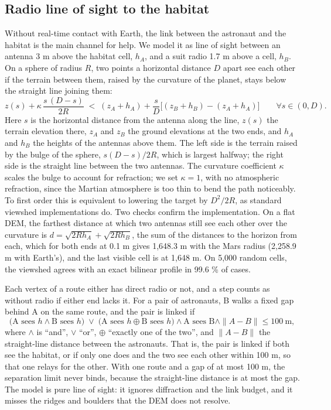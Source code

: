 \documentclass[11pt,a4paper]{article}
\begin{document}
\subsection{Radio line of sight to the habitat}

Without real-time contact with Earth, the link between the astronaut and the habitat is the main channel for help. We model it as line of sight between an antenna 3 m above the habitat cell, $h_A$, and a suit radio 1.7 m above a cell, $h_B$. On a sphere of radius $R$, two points a horizontal distance $D$ apart see each other if the terrain between them, raised by the curvature of the planet, stays below the straight line joining them: \[z(s) + \kappa\,\frac{s\,(D - s)}{2R} \;<\; (z_A + h_A) + \frac{s}{D}\big[(z_B + h_B) - (z_A + h_A)\big]\qquad \forall s \in (0, D).\] Here $s$ is the horizontal distance from the antenna along the line, $z(s)$ the terrain elevation there, $z_A$ and $z_B$ the ground elevations at the two ends, and $h_A$ and $h_B$ the heights of the antennas above them. The left side is the terrain raised by the bulge of the sphere, $s(D - s)/2R$, which is largest halfway; the right side is the straight line between the two antennas. The curvature coefficient $\kappa$ scales the bulge to account for refraction; we set $\kappa = 1$, with no atmospheric refraction, since the Martian atmosphere is too thin to bend the path noticeably. To first order this is equivalent to lowering the target by $D^2/2R$, as standard viewshed implementations do. Two checks confirm the implementation. On a flat DEM, the farthest distance at which two antennas still see each other over the curvature is $d = \sqrt{2Rh_A} + \sqrt{2Rh_B}$, the sum of the distances to the horizon from each, which for both ends at 0.1 m gives 1,648.3 m with the Mars radius (2,258.9 m with Earth's), and the last visible cell is at 1,648 m. On 5,000 random cells, the viewshed agrees with an exact bilinear profile in 99.6 \% of cases.

Each vertex of a route either has direct radio or not, and a step counts as without radio if either end lacks it. For a pair of astronauts, B walks a fixed gap behind A on the same route, and the pair is linked if \[\big(\text{A sees } h \wedge \text{B sees } h\big) \;\vee\; \big(\text{A sees } h \oplus \text{B sees } h\big) \wedge \text{A sees B} \wedge \|A - B\| \le 100\ \text{m},\] where $\wedge$ is ``and'', $\vee$ ``or'', $\oplus$ ``exactly one of the two'', and $\|A - B\|$ the straight-line distance between the astronauts. That is, the pair is linked if both see the habitat, or if only one does and the two see each other within 100 m, so that one relays for the other. With one route and a gap of at most 100 m, the separation limit never binds, because the straight-line distance is at most the gap. The model is pure line of sight: it ignores diffraction and the link budget, and it misses the ridges and boulders that the DEM does not resolve.
\end{document}

